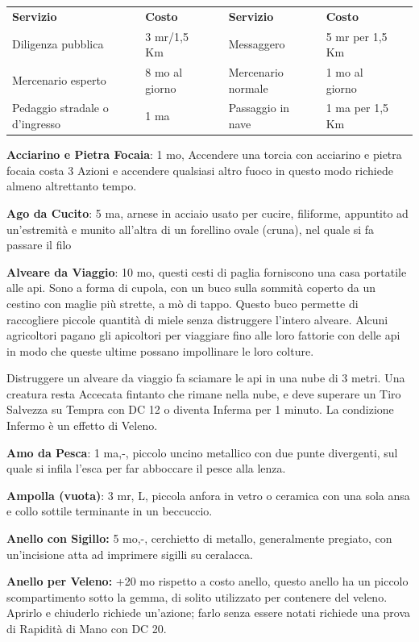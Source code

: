 \documentclass[a4paper,11pt,twoside,openany]{book}
\begin{document}
\begin{tabularx}{0.95\textwidth}{XllXll}
	\textbf{Servizio} & \textbf{Costo} & & \textbf{Servizio} & \textbf{Costo}  & \\
	Diligenza pubblica& 3 mr/1,5 Km    & & Messaggero  & 5 mr per 1,5 Km & \\
	Mercenario esperto& 8 mo al giorno & & Mercenario normale& 1 mo al giorno  & \\
	Pedaggio stradale o d’ingresso& 1 ma& & Passaggio in nave & 1 ma per 1,5 Km & \\

\end{tabularx}

\bigskip


\textbf{Acciarino e Pietra Focaia}: 1 mo, Accendere una torcia con acciarino e pietra focaia costa 3 Azioni e accendere qualsiasi altro fuoco in questo modo richiede almeno altrettanto tempo.

\textbf{Ago da Cucito}: 5 ma, arnese in acciaio usato per cucire, filiforme, appuntito ad un'estremità e munito all'altra di un forellino ovale (cruna), nel quale si fa passare il filo

\textbf{Alveare da Viaggio}: 10 mo, questi cesti di paglia forniscono una casa portatile alle api. Sono a forma di cupola, con un buco sulla sommità coperto da un cestino con maglie più strette, a mò di tappo. Questo buco permette di raccogliere piccole quantità di miele senza distruggere l'intero alveare. Alcuni agricoltori pagano gli apicoltori per viaggiare fino alle loro fattorie con delle api in modo che queste ultime possano impollinare le loro colture.

Distruggere un alveare da viaggio fa sciamare le api in una nube di 3 metri. Una creatura resta Accecata fintanto che rimane nella nube, e deve superare un Tiro Salvezza su Tempra con DC 12 o diventa Inferma per 1 minuto. La condizione Infermo è un effetto di Veleno.

\textbf{Amo da Pesca}: 1 ma,-, piccolo uncino metallico con due punte divergenti, sul quale si infila l'esca per far abboccare il pesce alla lenza.

\textbf{Ampolla (vuota)}: 3 mr, L, piccola anfora in vetro o ceramica con una sola ansa e collo sottile terminante in un beccuccio.

\textbf{Anello con Sigillo:} 5 mo,-, cerchietto di metallo, generalmente pregiato, con un'incisione atta ad imprimere sigilli su ceralacca.

\textbf{Anello per Veleno:} +20 mo rispetto a costo anello, questo anello ha un piccolo scompartimento sotto la gemma, di solito utilizzato per contenere del veleno. Aprirlo e chiuderlo richiede un'azione; farlo senza essere notati richiede una prova di Rapidità di Mano con DC 20.
\end{document}
